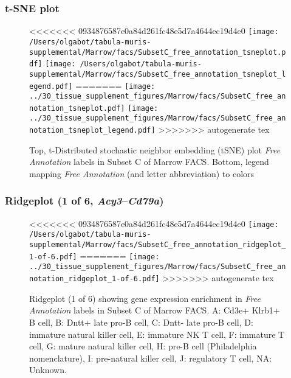 \clearpage
\subsubsection{t-SNE plot}
\begin{figure}[h]
\centering
<<<<<<< 0934876587e0a84d261fc48e5d7a4644ec19d4e0
\texttt{[image: /Users/olgabot/tabula-muris-supplemental/Marrow/facs/SubsetC\_free\_annotation\_tsneplot.pdf]}
\texttt{[image: /Users/olgabot/tabula-muris-supplemental/Marrow/facs/SubsetC\_free\_annotation\_tsneplot\_legend.pdf]}
=======
\texttt{[image: ../30\_tissue\_supplement\_figures/Marrow/facs/SubsetC\_free\_annotation\_tsneplot.pdf]}
\texttt{[image: ../30\_tissue\_supplement\_figures/Marrow/facs/SubsetC\_free\_annotation\_tsneplot\_legend.pdf]}
>>>>>>> autogenerate tex
\caption{Top, t-Distributed stochastic neighbor embedding (tSNE) plot  \emph{Free Annotation} labels in Subset C of Marrow FACS. Bottom, legend mapping \emph{Free Annotation} (and letter abbreviation) to colors}
\end{figure}


\clearpage

\subsubsection{Ridgeplot (1 of 6, \emph{Acy3}--\emph{Cd79a})}
\begin{figure}[h]
\centering
<<<<<<< 0934876587e0a84d261fc48e5d7a4644ec19d4e0
\texttt{[image: /Users/olgabot/tabula-muris-supplemental/Marrow/facs/SubsetC\_free\_annotation\_ridgeplot\_1-of-6.pdf]}
=======
\texttt{[image: ../30\_tissue\_supplement\_figures/Marrow/facs/SubsetC\_free\_annotation\_ridgeplot\_1-of-6.pdf]}
>>>>>>> autogenerate tex

\caption{ Ridgeplot (1 of 6)  showing gene expression enrichment in \emph{Free Annotation} labels in Subset C of Marrow FACS. A: Cd3e+ Klrb1+ B cell, B: Dntt+ late pro-B cell, C: Dntt- late pro-B cell, D: immature natural killer cell, E: immature NK T cell, F: immature T cell, G: mature natural killer cell, H: pre-B cell (Philadelphia nomenclature), I: pre-natural killer cell, J: regulatory T cell, NA: Unknown.}
\end{figure}


\clearpage

